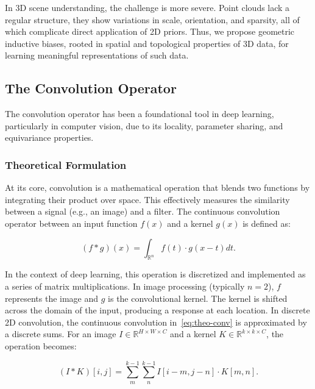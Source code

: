 In 3D scene understanding, the challenge is more severe.
%
Point clouds lack a regular structure, they show variations in scale,
orientation, and sparsity, all of which complicate direct application of 2D
priors.
%
Thus, we propose geometric inductive biases, rooted in spatial and topological
properties of 3D data, for learning meaningful representations of such data.

\subsection{The Convolution Operator}

The convolution operator has been a foundational tool in deep learning,
particularly in computer vision, due to its locality, parameter sharing, and
equivariance properties.

\subsubsection{Theoretical Formulation}

At its core, convolution is a mathematical operation that blends two functions
by integrating their product over space.
%
This effectively measures the similarity between a signal (e.g., an image) and
a filter.
%
The continuous convolution operator between an input function $f(x)$ and a
kernel $g(x)$ is defined as:

\begin{equation}\label{eq:theo-conv}
    (f * g)(x) = \int_{\mathbb{R}^n} f(t) \cdot g(x - t) dt.
\end{equation}

In the context of deep learning, this operation is discretized and implemented
as a series of matrix multiplications.
%
In image processing (typically $n = 2$), $f$ represents the image and $g$ is
the convolutional kernel.
%
The kernel is shifted across the domain of the input, producing a response at
each location.
%
In discrete 2D convolution, the continuous convolution in~\eqref{eq:theo-conv}
is approximated by a discrete sums. For an image $I \in \mathbb{R}^{H \times W
        \times C}$ and a kernel $K \in \mathbb{R}^{k \times k \times C}$, the operation
becomes:

\begin{equation}\label{eq:discrete-conv}
    (I * K)[i, j] = \sum_{m}^{k-1} \sum_{n}^{k-1} I[i - m, j - n] \cdot K[m,n].
\end{equation}

